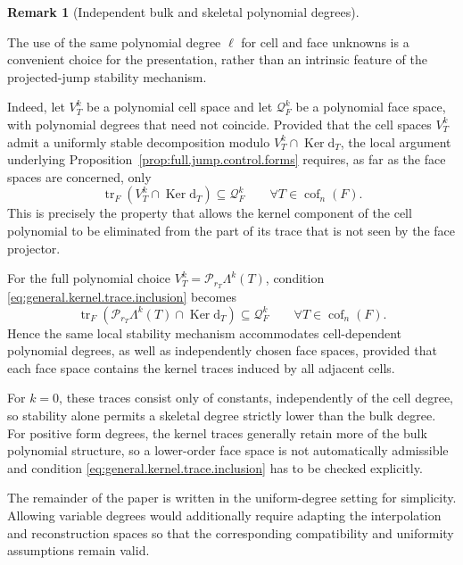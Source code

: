 \documentclass[a4paper,11pt]{article}
\theoremstyle{definition}
\newtheorem{remark}[theorem]{Remark}
\newcommand{\DIFF}{\mathrm{d}}
\newcommand{\cof}[1]{\operatorname{cof}_{#1}}
\newcommand{\PL}[2]{\mathcal{P}_{#1}\Lambda^{#2}}
\newcommand{\trc}{\operatorname{tr}}
\newcommand{\Ker}{\operatorname{Ker}}
\begin{document}
\begin{remark}[Independent bulk and skeletal polynomial degrees]
\label{rem:bulk.skeletal.degrees}

The use of the same polynomial degree $\ell$ for cell and face unknowns is a convenient choice for the presentation, rather than an intrinsic feature of the projected-jump stability mechanism.

Indeed, let $V_T^k$ be a polynomial cell space and let $\mathcal Q_F^k$ be a polynomial face space, with polynomial degrees that need not coincide.
Provided that the cell spaces $V_T^k$ admit a uniformly stable decomposition modulo $V_T^k\cap\Ker\DIFF_T$, the local argument underlying Proposition~\ref{prop:full.jump.control.forms} requires, as far as the face spaces are concerned, only
\begin{equation}\label{eq:general.kernel.trace.inclusion}
  \trc_F
  \left(
    V_T^k\cap\Ker\DIFF_T
  \right)
  \subseteq
  \mathcal Q_F^k
  \qquad
  \forall T\in\cof{n}(F).
\end{equation}
This is precisely the property that allows the kernel component of the cell polynomial to be eliminated from the part of its trace that is not seen by the face projector.

For the full polynomial choice $V_T^k=\PL{r_T}{k}(T)$, condition \eqref{eq:general.kernel.trace.inclusion} becomes
\[
  \trc_F
  \left(
    \PL{r_T}{k}(T)\cap\Ker\DIFF_T
  \right)
  \subseteq
  \mathcal Q_F^k
  \qquad
  \forall T\in\cof{n}(F).
\]
Hence the same local stability mechanism accommodates cell-dependent polynomial degrees, as well as independently chosen face spaces, provided that each face space contains the kernel traces induced by all adjacent cells.

For $k=0$, these traces consist only of constants, independently of the cell degree, so stability alone permits a skeletal degree strictly lower than the bulk degree.
For positive form degrees, the kernel traces generally retain more of the bulk polynomial structure, so a lower-order face space is not automatically admissible and condition \eqref{eq:general.kernel.trace.inclusion} has to be checked explicitly.

The remainder of the paper is written in the uniform-degree setting for simplicity.
Allowing variable degrees would additionally require adapting the interpolation and reconstruction spaces so that the corresponding compatibility and uniformity assumptions remain valid.
\end{remark}
\end{document}
